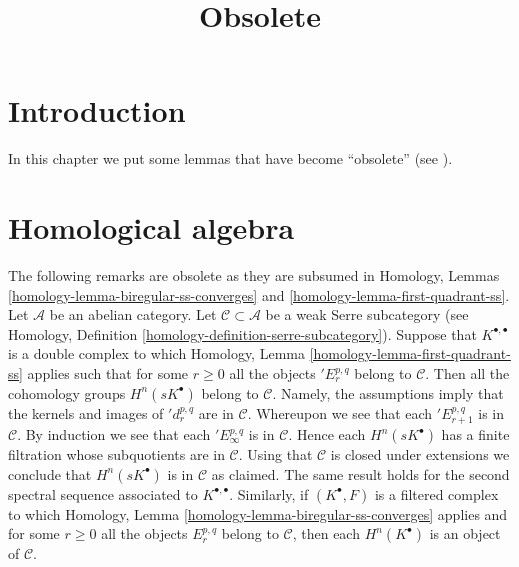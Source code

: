 

%


\title{Obsolete}

\maketitle

\label{section-phantom}

\tableofcontents




\section{Introduction}
\label{section-introduction}

\noindent
In this chapter we put some lemmas that have become ``obsolete''
(see \cite{Miller}).


\section{Homological algebra}
\label{section-homological-algebra}

\begin{remark}
\label{remark-weak-serre-subcategory}
The following remarks are obsolete as they are subsumed in
Homology, Lemmas \ref{homology-lemma-biregular-ss-converges} and
\ref{homology-lemma-first-quadrant-ss}.
Let $\mathcal{A}$ be an abelian category.
Let $\mathcal{C} \subset \mathcal{A}$
be a weak Serre subcategory (see
Homology, Definition \ref{homology-definition-serre-subcategory}).
Suppose that $K^{\bullet, \bullet}$ is a double complex to which
Homology, Lemma \ref{homology-lemma-first-quadrant-ss}
applies such that for some $r \geq 0$ all the objects
${}'E_r^{p, q}$ belong to $\mathcal{C}$. Then all the cohomology groups
$H^n(sK^\bullet)$ belong to $\mathcal{C}$. Namely, the assumptions imply
that the kernels and images of ${}'d_r^{p, q}$ are in $\mathcal{C}$.
Whereupon we see that each ${}'E_{r + 1}^{p, q}$ is in $\mathcal{C}$.
By induction we see that each ${}'E_\infty^{p, q}$ is in $\mathcal{C}$.
Hence each $H^n(sK^\bullet)$ has a finite filtration whose subquotients
are in $\mathcal{C}$. Using that $\mathcal{C}$ is closed under extensions
we conclude that $H^n(sK^\bullet)$ is in $\mathcal{C}$ as claimed.
The same result holds for the second spectral sequence associated
to $K^{\bullet, \bullet}$. Similarly, if $(K^\bullet, F)$ is a filtered
complex to which
Homology, Lemma \ref{homology-lemma-biregular-ss-converges}
applies and for some $r \geq 0$ all the objects $E_r^{p, q}$
belong to $\mathcal{C}$, then each $H^n(K^\bullet)$ is
an object of $\mathcal{C}$.
\end{remark}




